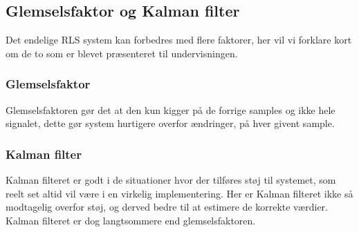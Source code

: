 \subsection{Glemselsfaktor og Kalman filter}  
Det endelige RLS system kan forbedres med flere faktorer, her vil vi forklare kort om de to som er blevet præsenteret til undervisningen. 

\subsubsection{Glemselsfaktor}
Glemselsfaktoren gør det at den kun kigger på de forrige samples og ikke hele signalet, dette gør system hurtigere overfor ændringer, på hver givent sample. 

\subsubsection{Kalman filter}
Kalman filteret er godt i de situationer hvor der tilføres støj til systemet, som reelt set altid vil være i en virkelig implementering. Her er Kalman filteret ikke så modtagelig overfor støj, og derved bedre til at estimere de korrekte værdier. Kalman filteret er dog langtsommere end glemselsfaktoren. 
  

